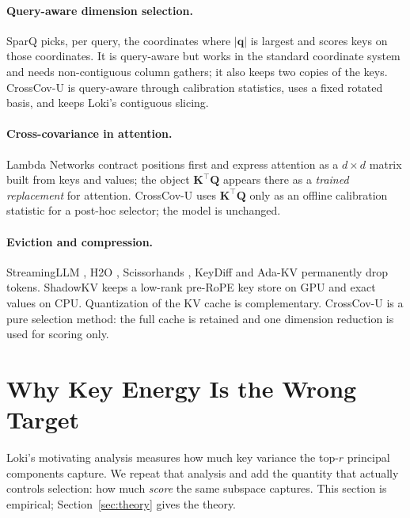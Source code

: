\documentclass[10pt]{article}
\newcommand{\bq}{\mathbf{q}}
\newcommand{\bK}{\mathbf{K}}
\newcommand{\bQ}{\mathbf{Q}}
\newcommand{\method}{CrossCov-U}
\theoremstyle{plain}
\theoremstyle{definition}
\theoremstyle{remark}
\begin{document}
\paragraph{Query-aware dimension selection.}
SparQ \citep{sparq} picks, per query, the coordinates where $|\bq|$ is
largest and scores keys on those coordinates. It is query-aware but works in
the standard coordinate system and needs non-contiguous column gathers; it
also keeps two copies of the keys. \method{} is query-aware through
calibration statistics, uses a fixed rotated basis, and keeps Loki's
contiguous slicing.

\paragraph{Cross-covariance in attention.}
Lambda Networks \citep{lambda} contract positions first and express attention
as a $d\times d$ matrix built from keys and values; the object
$\bK^\top\bQ$ appears there as a \emph{trained replacement} for attention.
\method{} uses $\bK^\top\bQ$ only as an offline calibration statistic for a
post-hoc selector; the model is unchanged.

\paragraph{Eviction and compression.}
StreamingLLM \citep{streamingllm}, H2O \citep{h2o}, Scissorhands
\citep{scissorhands}, KeyDiff \citep{keydiff} and Ada-KV \citep{adakv}
permanently drop tokens. ShadowKV \citep{shadowkv} keeps a low-rank pre-RoPE
key store on GPU and exact values on CPU. Quantization of the KV cache
\citep{kivi} is complementary. \method{} is a pure selection method: the full
cache is retained and one dimension reduction is used for scoring only.


\section{Why Key Energy Is the Wrong Target}
\label{sec:analysis}

Loki's motivating analysis measures how much key variance the top-$r$
principal components capture. We repeat that analysis and add the quantity
that actually controls selection: how much \emph{score} the same subspace
captures. This section is empirical; Section~\ref{sec:theory} gives the
theory.
\end{document}

